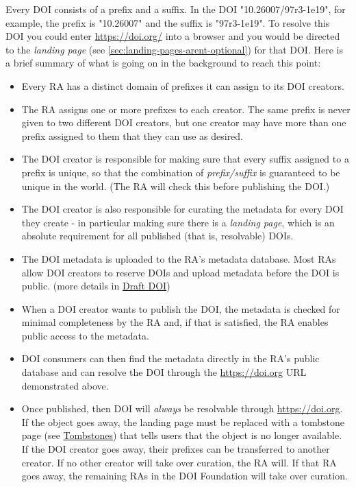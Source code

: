 \documentclass[11pt,a4paper]{ivoa}
\begin{document}
Every DOI consists of a prefix and a suffix. In the DOI "10.26007/97r3-1e19", for example, the prefix is "10.26007" and the suffix is "97r3-1e19". To resolve this DOI you could enter \href{https://doi.org/10.26007/97r3-1e19}{https://doi.org/} into a browser and you would be directed to the \emph{landing page} (see \ref{sec:landing-pages-arent-optional}) for that DOI. Here is a brief summary of what is going on in the background to reach this point:

\begin{itemize}
\item{} Every RA has a distinct domain of prefixes it can assign to its DOI creators.
\item{} The RA assigns one or more prefixes to each creator. The same prefix is never given to two different DOI creators, but one creator may have more than one prefix assigned to them that they can use as desired.
\item{} The DOI creator is responsible for making sure that every suffix assigned to a prefix is unique, so that the combination of \emph{prefix/suffix} is guaranteed to be unique in the world. (The RA will check this before publishing the DOI.)
\item{} The DOI creator is also responsible for curating the metadata for every DOI they create - in particular making sure there is a \emph{landing page}, which is an absolute requirement for all published (that is, resolvable) DOIs.
\item{} The DOI metadata is uploaded to the RA's metadata database. Most RAs allow DOI creators to reserve DOIs and upload metadata before the DOI is public. (more details in \hyperlink{draft-dois}{Draft DOI})
\item{} When a DOI creator wants to publish the DOI, the metadata is checked for minimal completeness by the RA and, if that is satisfied, the RA enables public access to the metadata.
\item{} DOI consumers can then find the metadata directly in the RA's public database and can resolve the DOI through the \href{https://doi.org}{https://doi.org} URL demonstrated above.
\item{} Once published, then DOI will \emph{always} be resolvable through \href{http://doi.org}{https://doi.org}. If the object goes away, the landing page must be replaced with a tombstone page (see \hyperlink{tombstones}{Tombstones}) that tells users that the object is no longer available. If the DOI creator goes away, their prefixes can be transferred to another creator. If no other creator will take over curation, the RA will. If that RA goes away, the remaining RAs in the DOI Foundation will take over curation.
\end{itemize}
\end{document}
